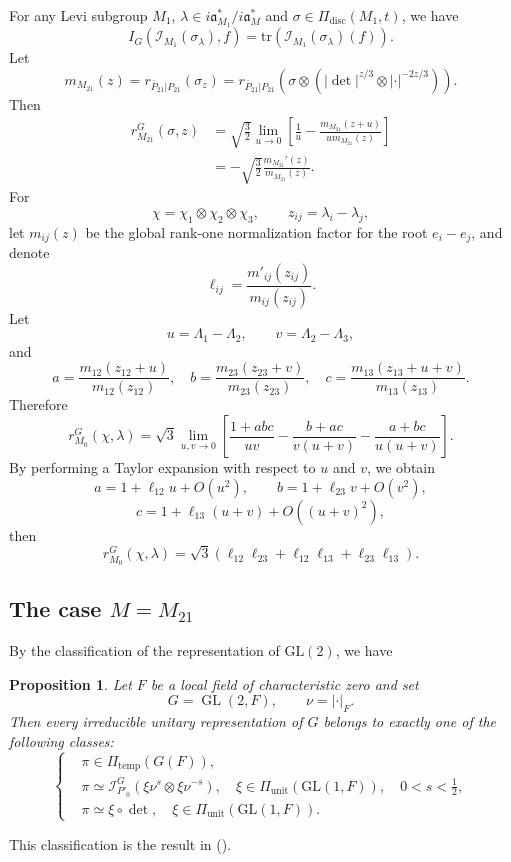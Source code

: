 \documentclass[11pt]{amsart}
\newtheorem {proposition}[theorem]    {Proposition}
\renewcommand{\rm}{\mathrm}
\newcommand{\GGL}{\mathrm{GL}}
\theoremstyle{definition}
\numberwithin{equation}{section}
\begin{document}
    For any Levi subgroup \(M_1\), \(\lambda\in i\mathfrak{a}_{M_1}^* / i\mathfrak{a}_M^*\) and \(\sigma\in \Pi_{\rm{disc}}(M_1,t)\), we have \[I_G(\mathscr{I}_{M_1}(\sigma_\lambda),f)=\rm{tr}(\mathscr{I}_{M_1}(\sigma_\lambda)(f)).\]
	Let
	\[
	m_{M_{21}}(z) = r_{\bar{P}_{21}|P_{21}}(\sigma_{z})=r_{\bar{P}_{21}|P_{21}}\left(\sigma\otimes \left( | \det |^{z/3} \otimes | \cdot |^{-2z/3} \right)\right) .
	\]
	Then
	\begin{align*}
		r_{M_{21}}^G(\sigma, z) &= \sqrt{\frac{3}{2}}\lim_{u \to 0} \left[ \frac{1}{u} - \frac{m_{M_{21}}(z+u)}{u m_{M_{21}}(z)} \right] \\
		&=  -\sqrt{\frac{3}{2}} \frac{m_{M_{21}}'(z)}{m_{M_{21}}(z)}  .
	\end{align*}
	For
	\[
	\chi = \chi_1 \otimes \chi_2 \otimes \chi_3, \qquad z_{ij} = \lambda_i - \lambda_j,
	\]
	let \(m_{ij}(z)\) be the global rank-one normalization factor for the root \(e_i - e_j\), and denote
	\[
	\ell_{ij} = \frac{m'_{ij}(z_{ij})}{m_{ij}(z_{ij})}.
	\]
	Let
	\[
	u = \Lambda_1 - \Lambda_2, \qquad v = \Lambda_2 - \Lambda_3,
	\]
	and
	\[
	a = \frac{m_{12}(z_{12} + u)}{m_{12}(z_{12})}, \quad b = \frac{m_{23}(z_{23} + v)}{m_{23}(z_{23})}, \quad c = \frac{m_{13}(z_{13} + u + v)}{m_{13}(z_{13})}.
	\]
	Therefore
	\[
	r_{M_0}^G(\chi, \lambda) = \sqrt{3} \lim_{u, v \to 0} \left[ \frac{1 + abc}{uv} - \frac{b + ac}{v(u+v)} - \frac{a + bc}{u(u+v)} \right].
	\]
	By performing a Taylor expansion with respect to 
	\(u\) and \(v\), we obtain
	\[
	a = 1 + \ell_{12}u + O(u^2), \qquad b = 1 + \ell_{23}v + O(v^2),
	\]
	\[
	c = 1 + \ell_{13}(u + v) + O((u + v)^2),
	\]
	then
	\[
	r_{M_0}^G(\chi, \lambda) =\sqrt{3} (\ell_{12}\ell_{23} + \ell_{12}\ell_{13} + \ell_{23}\ell_{13}).
	\]
	
	
	
	\subsection{The case  \(M=M_{21}\)}
	By the classification of the representation of \(\GGL(2)\), we have 
	\begin{proposition}\label{gl2}
		Let \(F\) be a local field of characteristic zero and set
		\[
		G = \operatorname{GL}(2,F), \qquad \nu = |\cdot|_F.
		\]
		Then every irreducible unitary representation of \(G\) belongs to exactly one of the following classes:
		\[
		\left\{
		\begin{aligned}
			& \pi \in \Pi_{\mathrm{temp}}(G(F)), \\
			& \pi \simeq \mathscr{I}_{P'_0}^G (\xi \nu^s \otimes \xi \nu^{-s}), \quad \xi \in \Pi_{\rm{unit}}(\GGL(1,F)), \quad 0 < s < \frac{1}{2}, \\
			& \pi \simeq \xi \circ \det, \quad \xi \in \Pi_{\rm{unit}}(\GGL(1,F)).
		\end{aligned}
		\right.
		\]
	\end{proposition}
	This classification is the result in (\cite{JL70}).
\end{document}
